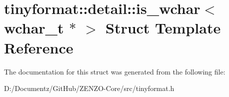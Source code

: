 \hypertarget{structtinyformat_1_1detail_1_1is__wchar_3_01wchar__t_01_5_01_4}{}\section{tinyformat\+::detail\+::is\+\_\+wchar$<$ wchar\+\_\+t $\ast$ $>$ Struct Template Reference}
\label{structtinyformat_1_1detail_1_1is__wchar_3_01wchar__t_01_5_01_4}


The documentation for this struct was generated from the following file\+:\begin{DoxyCompactItemize}
\item 
D\+:/\+Documentz/\+Git\+Hub/\+Z\+E\+N\+Z\+O-\/\+Core/src/tinyformat.\+h\end{DoxyCompactItemize}
